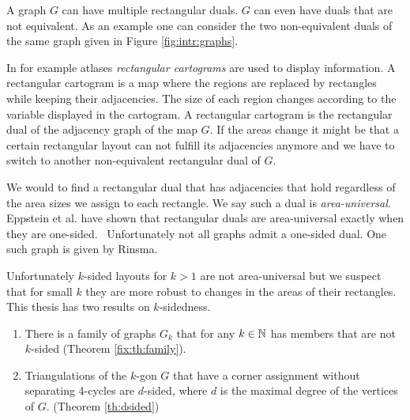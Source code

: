    A graph $G$ can have multiple rectangular duals. $G$ can even have duals that are not equivalent. As an example one can consider the two non-equivalent duals of the same graph given in Figure \ref{fig:intr:graphs}.

  In for example atlases \emph{rectangular cartograms} are used to display information. A rectangular cartogram is a map where the regions are replaced by rectangles while keeping their adjacencies. The size of each region changes according to the variable displayed in the cartogram.  A rectangular cartogram is the rectangular dual of the adjacency graph of the map $G$.
  If the areas change it might be that a certain rectangular layout can not fulfill its adjacencies anymore and we have to switch to another non-equivalent rectangular dual of $G$.

  We would to find a rectangular dual that has adjacencies that hold regardless of the area sizes we assign to each rectangle. We say such a dual is \emph{area-universal}.
  Eppstein et al. have shown that rectangular duals are area-universal exactly when they are one-sided.~\cite{Eppstein2012} Unfortunately not all graphs admit a one-sided dual. One such graph is given by Rinsma.~\cite{Rinsma1987} 

  Unfortunately $k$-sided layouts for $k>1$ are not area-universal but we suspect that for small $k$ they are more robust to changes in the areas of their rectangles. This thesis has two results on $k$-sidedness.
  \begin{enumerate}
    \item There is a family of graphs $G_k$ that for any $k \in \mathbb{N}$ has members that are not $k$-sided (Theorem \ref{fix:th:family}).
    \item Triangulations of the $k$-gon $G$ that have a corner assignment without separating 4-cycles are $d$-sided, where $d$ is the maximal degree of the vertices of $G$. (Theorem \ref{th:dsided})
  \end{enumerate}

